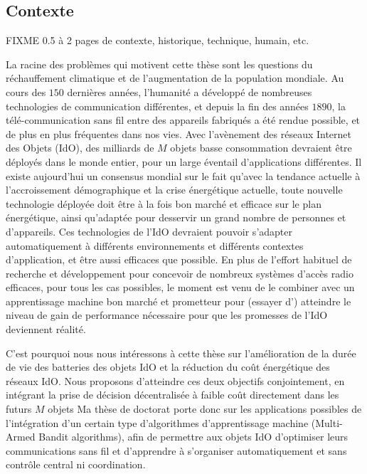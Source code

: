 \begin{resume_fr}
\section*{Contexte}

FIXME 0.5 à 2 pages de contexte, historique, technique, humain, etc.

%
La racine des problèmes qui motivent cette thèse sont les questions du réchauffement climatique et de l'augmentation de la population mondiale.
Au cours des $150$ dernières années, l'humanité a développé de nombreuses technologies de communication différentes, et depuis la fin des années $1890$, la télé-communication sans fil entre des appareils fabriqués a été rendue possible, et de plus en plus fréquentes dans nos vies.
Avec l'avènement des réseaux Internet des Objets (IdO), des milliards de $M$ objets basse consommation devraient être déployés dans le monde entier, pour un large éventail d'applications différentes.
Il existe aujourd'hui un consensus mondial sur le fait qu'avec la tendance actuelle à l'accroissement démographique et la crise énergétique actuelle, toute nouvelle technologie déployée doit être à la fois bon marché et efficace sur le plan énergétique,
ainsi qu'adaptée pour desservir un grand nombre de personnes et d'appareils.
%
Ces technologies de l'IdO devraient pouvoir s'adapter automatiquement à différents environnements et différents contextes d'application, et être aussi efficaces que possible.
%
En plus de l'effort habituel de recherche et développement pour concevoir de nombreux systèmes d'accès radio efficaces, pour tous les cas possibles,
le moment est venu de le combiner avec un apprentissage machine bon marché et prometteur pour (essayer d') atteindre le niveau de gain de performance nécessaire pour que les promesses de l'IdO deviennent réalité.


C'est pourquoi nous nous intéressons à cette thèse sur
l'amélioration de la durée de vie des batteries des objets IdO et la réduction du coût énergétique des réseaux IdO.
Nous proposons d'atteindre ces deux objectifs conjointement, en intégrant la prise de décision décentralisée à faible coût directement dans les futurs $M$ objets
%
Ma thèse de doctorat porte donc sur les applications possibles de l'intégration d'un certain type d'algorithmes d'apprentissage machine (Multi-Armed Bandit algorithms), afin de permettre aux objets IdO d'optimiser leurs communications sans fil et d'apprendre à s'organiser automatiquement et sans contrôle central ni coordination.



\end{resume_fr}
